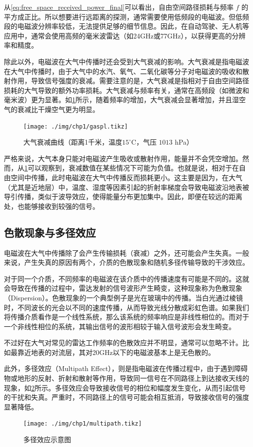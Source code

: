 从\cref{eq:free_space_received_power_final}可以看出，自由空间路径损耗与频率 $f$ 的平方成正比。所以想要进行远距离的探测，通常需要使用低频段的电磁波。但低频段的电磁波分辨率较低，无法提供足够的细节信息。因此，在自动驾驶、无人机等应用中，通常会使用高频的毫米波雷达（如24GHz或77GHz），以获得更高的分辨率和精度。

除此以外，电磁波在大气中传播时还会受到大气衰减的影响。大气衰减是指电磁波在大气中传播时，由于大气中的水汽、氧气、二氧化碳等分子对电磁波的吸收和散射作用，导致信号强度的衰减。需要注意的是，大气衰减是指相对于自由空间路径损耗的大气导致的额外功率损耗。大气衰减与频率有关，通常在高频段（如微波和毫米波）更为显著。如\cref{fig_chp1_gaspl}所示，随着频率的增加，大气衰减会显著增加，并且湿空气的衰减比干燥空气更为明显。

\begin{figure}[htb!]
    \centering
    \texttt{[image: ./img/chp1/gaspl.tikz]}
    \caption{大气衰减曲线（距离1千米，温度$15^\circ$C，气压 $1013$ hPa）}
    \label{fig_chp1_gaspl}
\end{figure}

严格来说，大气本身只能对电磁波产生吸收或散射作用，能量并不会凭空增加。然而，从\cref{fig_chp1_gaspl}可以观察到，衰减数值在某些情况下可能为负值。也就是说，相对于在自由空间中传播，此时电磁波在大气中传播反而损耗更小。这主要是因为，在大气（尤其是近地层）中，温度、湿度等因素引起的折射率梯度会导致电磁波沿地表被导引传播，类似于波导效应，使得能量分布更加集中。因此，即便在较远的距离处，也能够接收到较强的信号。

\subsection{色散现象与多径效应}
电磁波在大气中传播除了会产生传输损耗（衰减）之外，还可能会产生失真。一般来说，产生失真的原因有两个，介质的色散现象和随机多径传输导致的干涉效应。

对于同一个介质，不同频率的电磁波在该介质中的传播速度有可能是不同的。这就会导致在传播的过程中，雷达发射的信号波形产生畸变，这种现象称为色散现象（Dispersion）。色散现象的一个典型例子是光在玻璃中的传播。当白光通过棱镜时，不同波长的光会以不同的速度传播，从而导致光线分散成彩虹色谱。如果我们将传播介质看作是一个线性系统，那么该系统的频率响应是非线性相位的。而对于一个非线性相位的系统，其输出信号的波形相较于输入信号波形会发生畸变。

不过好在大气对常见的雷达工作频率的色散效应并不明显，通常可以忽略不计。比如最靠近地表的对流层，其对20GHz以下的电磁波基本上是无色散的。

此外，多径效应（Multipath Effect），则是指电磁波在传播过程中，由于遇到障碍物或地形的反射、折射和散射等作用，导致同一信号在不同路径上到达接收天线的现象，如\cref{fig_chp1_multipath}所示。多径效应会导致接收信号的相位和幅度发生变化，从而引起信号的干扰和失真。严重时，不同路径上的信号可能会相互抵消，导致接收信号的强度显著降低。

\begin{figure}[htb!]
    \centering
    \texttt{[image: ./img/chp1/multipath.tikz]}
    \caption{多径效应示意图}
    \label{fig_chp1_multipath}
\end{figure}

